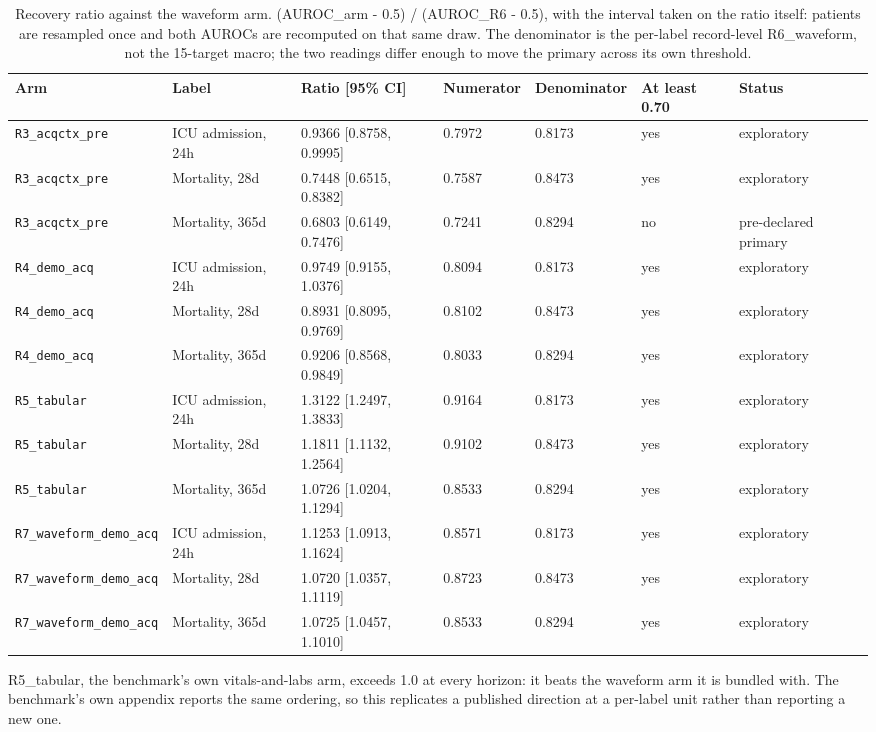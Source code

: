\begin{table}[t]
\centering
\small
\caption{Recovery ratio against the waveform arm. (AUROC\_arm - 0.5) / (AUROC\_R6 - 0.5), with the interval taken on the ratio itself: patients are resampled once and both AUROCs are recomputed on that same draw. The denominator is the per-label record-level R6\_waveform, not the 15-target macro; the two readings differ enough to move the primary across its own threshold.}
\label{tab:recovery}
\begin{tabular}{lllllll}
\toprule
Arm & Label & Ratio [95\% CI] & Numerator & Denominator & At least 0.70 & Status \\
\midrule
\texttt{R3\_acqctx\_pre} & ICU admission, 24h & 0.9366 [0.8758, 0.9995] & 0.7972 & 0.8173 & yes & exploratory \\
\texttt{R3\_acqctx\_pre} & Mortality, 28d & 0.7448 [0.6515, 0.8382] & 0.7587 & 0.8473 & yes & exploratory \\
\texttt{R3\_acqctx\_pre} & Mortality, 365d & 0.6803 [0.6149, 0.7476] & 0.7241 & 0.8294 & no & pre-declared primary \\
\texttt{R4\_demo\_acq} & ICU admission, 24h & 0.9749 [0.9155, 1.0376] & 0.8094 & 0.8173 & yes & exploratory \\
\texttt{R4\_demo\_acq} & Mortality, 28d & 0.8931 [0.8095, 0.9769] & 0.8102 & 0.8473 & yes & exploratory \\
\texttt{R4\_demo\_acq} & Mortality, 365d & 0.9206 [0.8568, 0.9849] & 0.8033 & 0.8294 & yes & exploratory \\
\texttt{R5\_tabular} & ICU admission, 24h & 1.3122 [1.2497, 1.3833] & 0.9164 & 0.8173 & yes & exploratory \\
\texttt{R5\_tabular} & Mortality, 28d & 1.1811 [1.1132, 1.2564] & 0.9102 & 0.8473 & yes & exploratory \\
\texttt{R5\_tabular} & Mortality, 365d & 1.0726 [1.0204, 1.1294] & 0.8533 & 0.8294 & yes & exploratory \\
\texttt{R7\_waveform\_demo\_acq} & ICU admission, 24h & 1.1253 [1.0913, 1.1624] & 0.8571 & 0.8173 & yes & exploratory \\
\texttt{R7\_waveform\_demo\_acq} & Mortality, 28d & 1.0720 [1.0357, 1.1119] & 0.8723 & 0.8473 & yes & exploratory \\
\texttt{R7\_waveform\_demo\_acq} & Mortality, 365d & 1.0725 [1.0457, 1.1010] & 0.8533 & 0.8294 & yes & exploratory \\
\bottomrule
\end{tabular}
\par\footnotesize R5\_tabular, the benchmark's own vitals-and-labs arm, exceeds 1.0 at every horizon: it beats the waveform arm it is bundled with. The benchmark's own appendix reports the same ordering, so this replicates a published direction at a per-label unit rather than reporting a new one.
\end{table}

